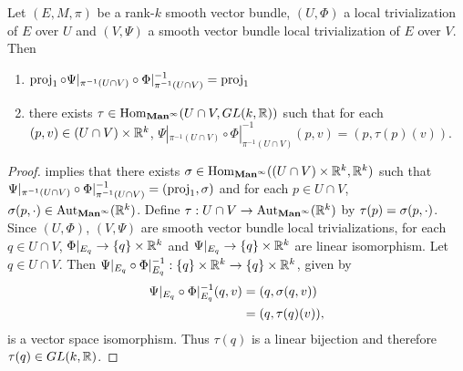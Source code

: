 \documentclass{book}
\begin{document}
\begin{ex} 
	Let $(E, M, \pi)$ be a rank-$k$ smooth vector bundle, $(U, \Phi)$ a local trivialization of $E$ over $U$ and $(V, \Psi)$ a smooth vector bundle local trivialization of $E$ over $V$. Then 
	\begin{enumerate}
		\item $\operatorname{\text{proj}}_1 \circ \Psi|_{\pi^{-1}(U \cap V)} \circ \Phi|^{-1}_{\pi^{-1}(U \cap V)} = \operatorname{\text{proj}}_1$
		\item there exists $\tau \in \operatorname{Hom}_{\operatorname*{\text{\textbf{Man}}^{\infty}}}(U \cap V, GL(k, \mathbb{R}))$ such that for each $(p, v) \in (U \cap V) \times \mathbb{R}^k$, $\Psi|_{\pi^{-1}(U \cap V)} \circ \Phi|^{-1}_{\pi^{-1}(U \cap V)}(p, v) = (p, \tau(p)(v))$.
	\end{enumerate}
\end{ex}

\begin{proof}
	 implies that there exists $\sigma \in \operatorname{Hom}_{\operatorname*{\text{\textbf{Man}}^{\infty}}}(( U \cap V) \times \mathbb{R}^k,  \mathbb{R}^k)$ such that $\Psi|_{\pi^{-1}(U \cap V)} \circ \Phi|^{-1}_{\pi^{-1}(U \cap V)} = (\operatorname{\text{proj}}_1, \sigma)$ and for each $p \in U \cap V$, $\sigma(p, \cdot) \in \operatorname{Aut}_{\operatorname*{\text{\textbf{Man}}^{\infty}}}(\mathbb{R}^k)$. Define $\tau: U \cap V \rightarrow \operatorname{Aut}_{\operatorname*{\text{\textbf{Man}}^{\infty}}}(\mathbb{R}^k)$ by $\tau(p) = \sigma(p, \cdot)$. Since $(U,\Phi)$, $(V, \Psi)$ are smooth vector bundle local trivializations, for each $q \in U\cap V$, $\Phi|_{E_q} \rightarrow \{q\} \times \mathbb{R}^k$ and $\Psi|_{E_q} \rightarrow \{q\} \times \mathbb{R}^k$ are linear isomorphism. Let $q \in U \cap V$. Then $\Psi|_{E_q} \circ \Phi|^{-1}_{E_q}: \{q\} \times \mathbb{R}^k \rightarrow \{q\} \times \mathbb{R}^k$, given by
	\begin{align*}
		\Psi|_{E_q} \circ \Phi|^{-1}_{E_q}(q, v) 
		& = (q, \sigma(q,v)) \\
		& = (q, \tau(q)(v)),
	\end{align*}
	is a vector space isomorphism. Thus $\tau(q)$ is a linear bijection and therefore $\tau(q) \in GL(k, \mathbb{R})$. 
\end{proof}
\end{document}
